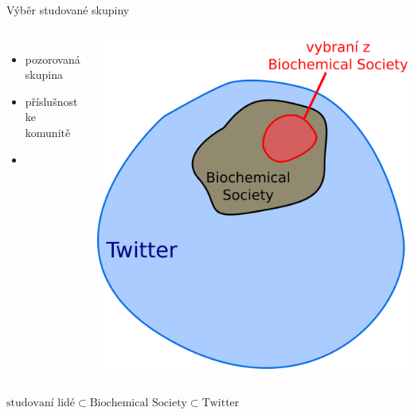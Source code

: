 \documentclass[notheorems,12pt]{beamer}
\begin{document}
\begin{frame}{Výběr studované skupiny}
    \vspace{-0.7cm}
    \begin{columns}
    \column{5cm}
    	\begin{itemize}
    		\item pozorovaná skupina
    		\item příslušnost ke komunitě
    		\item
    	\end{itemize}
    \column{6cm}
    	\center
    	\includegraphics[scale=0.32]{./Pics/sets.png}
    \end{columns}
    \center
    \begin{large}
        $\text{studovaní lidé} \subset \text{Biochemical Society} \subset \text{Twitter}$
    \end{large}
\end{frame}
\end{document}
